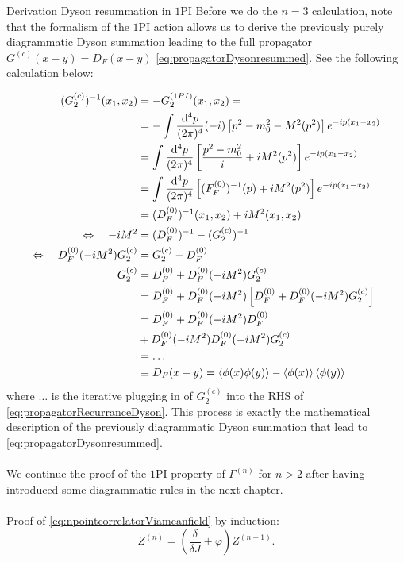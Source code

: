 \begin{mybox}{Derivation Dyson resummation in $1$PI}
	 Before we do the $n=3$ calculation, note that the formalism of the $1$PI action allows us to derive the previously purely diagrammatic Dyson summation leading to the full propagator $G^{(c)}(x-y)=D_F(x-y)$ \ref{eq:propagatorDysonresummed}. See the following calculation below:
\end{mybox}
	 \begin{align}
	(G^{(c)}_2)^{-1} (x_1,x_2)&=-G^{(1PI)}_2(x_1,x_2)=\nonumber\\
	&=-\int \frac{\mathrm{d}^4p}{(2\pi)^4}  (-i) \left[p^2-m^2_0 -M^2(p^2)\right]e^{-ip(x_1-x_2)}\nonumber\\
	&=\int \frac{\mathrm{d}^4 p}{(2 \pi)^4} \left[\frac{p^2-m^2_0}{i} +iM^2(p^2)\right]e^{-ip(x_1-x_2)}\nonumber\\
	&= \int \frac{\mathrm{d}^4 p}{(2 \pi)^4} \left[(F^{(0)}_F)^{-1} (p) + iM^2(p^2)\right]e^{-ip(x_1-x_2)} \nonumber\\
	&=(D^{(0)}_F)^{-1}(x_1,x_2) + iM^2(x_1,x_2) \nonumber\\
	\Leftrightarrow\quad  -iM^2 &= (D^{(0)}_F)^{-1}-(G^{(c)}_2)^{-1} \\
	\Leftrightarrow \quad D^{(0)}_F(-iM^2) G^{(c)}_2 &= G^{(c)}_2 -D^{(0)}_F\nonumber \\
	G^{(c)}_2 &= D^{(0)}_F + D^{(0)}_F (-iM^2)G^{(c)}_2 \label{eq:propagatorRecurranceDyson}\\
	&= D^{(0) }_F+D^{(0)}_F(-iM^2) \left[D^{(0)}_F+D^{(0)}_F(-iM^2 )G^{(c)}_2\right]\nonumber\\
	&= D^{(0)}_F + D^{(0)}_F (-iM^2) D^{(0)}_F\nonumber \\
	&+ D^{(0)}_F (-iM^2) D^{(0)}_F (-iM^2)G^{(c)}_2\nonumber\\
	&=\dots\nonumber\\
	&\equiv D_F(x-y) = \expval{\phi(x)\phi(y)}-\expval{\phi(x)}\expval{\phi(y)}\nonumber
\end{align}
where $\dots$ is the iterative plugging in of $G^{(c)}_2$ into the RHS of \ref{eq:propagatorRecurranceDyson}. This process is exactly the mathematical description of the previously diagrammatic Dyson summation that lead to \ref{eq:propagatorDysonresummed}.\\
\\
We continue the proof of the $1$PI property of $\Gamma^{(n)}$ for $n>2$ after having introduced some diagrammatic rules in the next chapter.\\
\\
Proof of \ref{eq:npointcorrelatorViameanfield} by induction:
\begin{equation}
	Z^{(n)} = \left(\frac{\delta}{\delta J} + \varphi\right) Z^{(n-1)}.
\end{equation}
 
